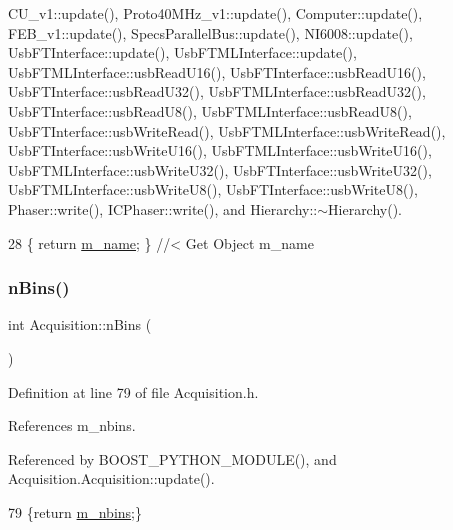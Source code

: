 C\+U\+\_\+v1\+::update(), Proto40\+M\+Hz\+\_\+v1\+::update(), Computer\+::update(), F\+E\+B\+\_\+v1\+::update(), Specs\+Parallel\+Bus\+::update(), N\+I6008\+::update(), Usb\+F\+T\+Interface\+::update(), Usb\+F\+T\+M\+L\+Interface\+::update(), Usb\+F\+T\+M\+L\+Interface\+::usb\+Read\+U16(), Usb\+F\+T\+Interface\+::usb\+Read\+U16(), Usb\+F\+T\+Interface\+::usb\+Read\+U32(), Usb\+F\+T\+M\+L\+Interface\+::usb\+Read\+U32(), Usb\+F\+T\+Interface\+::usb\+Read\+U8(), Usb\+F\+T\+M\+L\+Interface\+::usb\+Read\+U8(), Usb\+F\+T\+Interface\+::usb\+Write\+Read(), Usb\+F\+T\+M\+L\+Interface\+::usb\+Write\+Read(), Usb\+F\+T\+Interface\+::usb\+Write\+U16(), Usb\+F\+T\+M\+L\+Interface\+::usb\+Write\+U16(), Usb\+F\+T\+M\+L\+Interface\+::usb\+Write\+U32(), Usb\+F\+T\+Interface\+::usb\+Write\+U32(), Usb\+F\+T\+M\+L\+Interface\+::usb\+Write\+U8(), Usb\+F\+T\+Interface\+::usb\+Write\+U8(), Phaser\+::write(), I\+C\+Phaser\+::write(), and Hierarchy\+::$\sim$\+Hierarchy().


\begin{DoxyCode}
28 \{ \textcolor{keywordflow}{return} \hyperlink{classObject_a8b83c95c705d2c3ba0d081fe1710f48d}{m\_name}; \} \textcolor{comment}{//< Get Object m\_name}
\end{DoxyCode}
\mbox{\label{classAcquisition_a3a3dad0de9535d5a29c0810a5bdc3ae3}} 
\subsubsection{\texorpdfstring{n\+Bins()}{nBins()}}
{\footnotesize\ttfamily int Acquisition\+::n\+Bins (\begin{DoxyParamCaption}{ }\end{DoxyParamCaption})\hspace{0.3cm}{\ttfamily [inline]}}



Definition at line 79 of file Acquisition.\+h.



References m\+\_\+nbins.



Referenced by B\+O\+O\+S\+T\+\_\+\+P\+Y\+T\+H\+O\+N\+\_\+\+M\+O\+D\+U\+L\+E(), and Acquisition.\+Acquisition\+::update().


\begin{DoxyCode}
79 \{\textcolor{keywordflow}{return} \hyperlink{classAcquisition_a05bccdc4b9ada37beaeba8794ccef12d}{m\_nbins};\}
\end{DoxyCode}
\mbox{\label{classProcessus_a82a0487f82f07cc2c2dc2731f98149e7}} 
